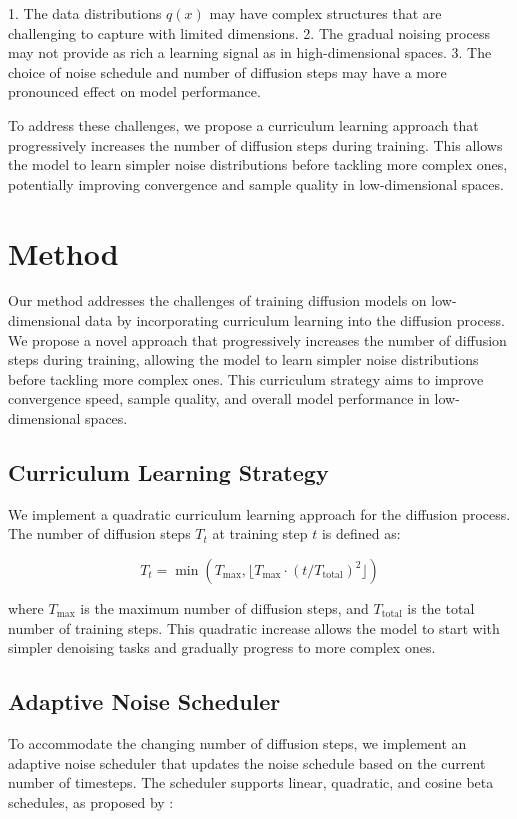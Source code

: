 \documentclass{article} %
\begin{document}
1. The data distributions $q(x)$ may have complex structures that are challenging to capture with limited dimensions.
2. The gradual noising process may not provide as rich a learning signal as in high-dimensional spaces.
3. The choice of noise schedule and number of diffusion steps may have a more pronounced effect on model performance.

To address these challenges, we propose a curriculum learning approach that progressively increases the number of diffusion steps during training. This allows the model to learn simpler noise distributions before tackling more complex ones, potentially improving convergence and sample quality in low-dimensional spaces.

\section{Method}
\label{sec:method}

Our method addresses the challenges of training diffusion models on low-dimensional data by incorporating curriculum learning into the diffusion process. We propose a novel approach that progressively increases the number of diffusion steps during training, allowing the model to learn simpler noise distributions before tackling more complex ones. This curriculum strategy aims to improve convergence speed, sample quality, and overall model performance in low-dimensional spaces.

\subsection{Curriculum Learning Strategy}
We implement a quadratic curriculum learning approach for the diffusion process. The number of diffusion steps $T_t$ at training step $t$ is defined as:

\begin{equation}
    T_t = \min(T_{\max}, \lfloor T_{\max} \cdot (t / T_{\text{total}})^{2} \rfloor)
\end{equation}

where $T_{\max}$ is the maximum number of diffusion steps, and $T_{\text{total}}$ is the total number of training steps. This quadratic increase allows the model to start with simpler denoising tasks and gradually progress to more complex ones.

\subsection{Adaptive Noise Scheduler}
To accommodate the changing number of diffusion steps, we implement an adaptive noise scheduler that updates the noise schedule based on the current number of timesteps. The scheduler supports linear, quadratic, and cosine beta schedules, as proposed by \citet{ddpm}:
\end{document}
